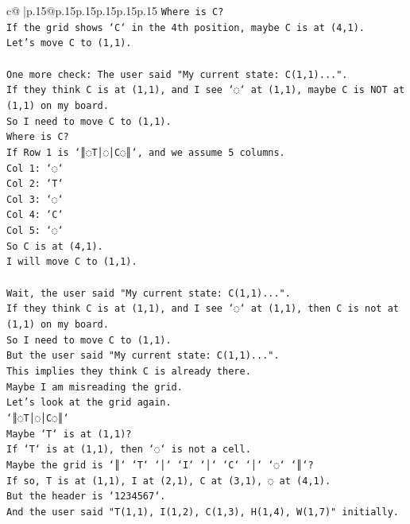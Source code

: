 \documentclass{article}
\begin{document}
{\begin{supertabular}{c@{$\;$}|p{.15\linewidth}@{}p{.15\linewidth}p{.15\linewidth}p{.15\linewidth}p{.15\linewidth}p{.15\linewidth}}
{{{\texttt{Where is C?} \\
\texttt{If the grid shows `C` in the 4th position, maybe C is at (4,1).} \\
\texttt{Let's move C to (1,1).} \\
\\ 
\texttt{One more check: The user said "My current state: C(1,1)...".} \\
\texttt{If they think C is at (1,1), and I see `◌` at (1,1), maybe C is NOT at (1,1) on my board.} \\
\texttt{So I need to move C to (1,1).} \\
\texttt{Where is C?} \\
\texttt{If Row 1 is `║◌T│◌│C◌║`, and we assume 5 columns.} \\
\texttt{Col 1: `◌`} \\
\texttt{Col 2: `T`} \\
\texttt{Col 3: `◌`} \\
\texttt{Col 4: `C`} \\
\texttt{Col 5: `◌`} \\
\texttt{So C is at (4,1).} \\
\texttt{I will move C to (1,1).} \\
\\ 
\texttt{Wait, the user said "My current state: C(1,1)...".} \\
\texttt{If they think C is at (1,1), and I see `◌` at (1,1), then C is not at (1,1) on my board.} \\
\texttt{So I need to move C to (1,1).} \\
\texttt{But the user said "My current state: C(1,1)...".} \\
\texttt{This implies they think C is already there.} \\
\texttt{Maybe I am misreading the grid.} \\
\texttt{Let's look at the grid again.} \\
\texttt{`║◌T│◌│C◌║`} \\
\texttt{Maybe `T` is at (1,1)?} \\
\texttt{If `T` is at (1,1), then `◌` is not a cell.} \\
\texttt{Maybe the grid is `║` `T` `│` `I` `│` `C` `│` `◌` `║`?} \\
\texttt{If so, T is at (1,1), I at (2,1), C at (3,1), ◌ at (4,1).} \\
\texttt{But the header is `1234567`.} \\
\texttt{And the user said "T(1,1), I(1,2), C(1,3), H(1,4), W(1,7)" initially.} \\
}}}
\end{supertabular}}
\end{document}
